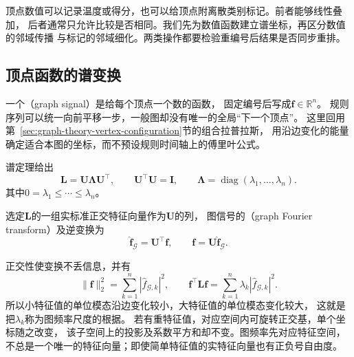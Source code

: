 \label{sec:graph-theory-vertex-functions}
\label{sec:graph-theory-structure-comparison}

顶点数值可以记录温度或得分，也可以给顶点附离散类别标记。前者能够线性叠加，
后者通常只允许比较是否相同。我们先为数值函数建立谱坐标，再区分数值的邻域传播
与标记的邻域细化。两类操作都要检验重编号后结果是否同步重排。

\subsection{顶点函数的谱变换}
\label{sec:signal-analysis-graph-state-kernels}

一个（graph signal）是给每个顶点一个数的函数，
固定编号后写成\(\bm f\in\mathbb R^n\)。
规则序列可以统一向前平移一步，一般图却没有唯一的全局“下一个顶点”。
这里回用第~\ref{sec:graph-theory-vertex-configuration}节的组合拉普拉斯，
用沿边变化的能量确定适合本图的坐标，而不预设规则时间轴上的傅里叶公式。

谱定理给出
\[
  \bm L=\bm U\bm\Lambda\bm U^\top,\qquad
  \bm U^\top\bm U=\bm I,\qquad
  \bm\Lambda=\operatorname{diag}(\lambda_1,\ldots,\lambda_n).
\]
其中\(0=\lambda_1\leq\cdots\leq\lambda_n\)。
\begin{definition}[图傅里叶变换]
  \label{def:signal-analysis-graph-fourier-transform}
  选定\(\bm L\)的一组实标准正交特征向量作为\(\bm U\)的列，
  图信号的（graph Fourier transform）及逆变换为
  \begin{equation}
    \widehat{\bm f}_{\mathcal G}=\bm U^\top\bm f,\qquad
    \bm f=\bm U\widehat{\bm f}_{\mathcal G}.
    \label{eq:signal-analysis-graph-fourier}
  \end{equation}
\end{definition}

正交性使变换不丢信息，并有
\[
  \|\bm f\|_2^2=\sum_{k=1}^n|\widehat f_{\mathcal G,k}|^2,\qquad
  \bm f^\top\bm L\bm f
  =\sum_{k=1}^n\lambda_k|\widehat f_{\mathcal G,k}|^2.
\]
所以小特征值的单位模态沿边变化较小，大特征值的单位模态变化较大，
这就是把\(\lambda_k\)称为图频率尺度的根据。
若有重特征值，对应空间内可旋转正交基，单个坐标随之改变，
该子空间上的投影及系数平方和却不变。图频率先对应特征空间，
不总是一个唯一的特征向量；即使简单特征值的实特征向量也有正负号自由度。

